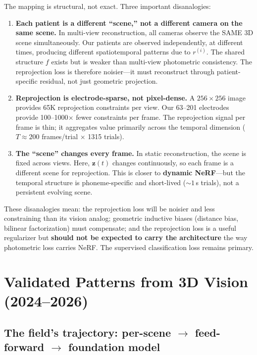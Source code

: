 \documentclass[11pt,letterpaper]{article}
\newcommand{\bfz}{\mathbf{z}}
\begin{document}
The mapping is structural, not exact. Three important disanalogies:

\begin{enumerate}[leftmargin=2em]
\item \textbf{Each patient is a different ``scene,'' not a different camera on the same scene.} In multi-view reconstruction, all cameras observe the SAME 3D scene simultaneously. Our patients are observed independently, at different times, producing different spatiotemporal patterns due to $r^{(i)}$. The shared structure $f$ exists but is weaker than multi-view photometric consistency. The reprojection loss is therefore noisier---it must reconstruct through patient-specific residual, not just geometric projection.

\item \textbf{Reprojection is electrode-sparse, not pixel-dense.} A $256{\times}256$ image provides 65K reprojection constraints per view. Our 63--201 electrodes provide 100--1000$\times$ fewer constraints per frame. The reprojection signal per frame is thin; it aggregates value primarily across the temporal dimension ($T {\approx} 200$ frames/trial $\times$ 1315 trials).

\item \textbf{The ``scene'' changes every frame.} In static reconstruction, the scene is fixed across views. Here, $\bfz(t)$ changes continuously, so each frame is a different scene for reprojection. This is closer to \textbf{dynamic NeRF}---but the temporal structure is phoneme-specific and short-lived (${\sim}1$\,s trials), not a persistent evolving scene.
\end{enumerate}

\noindent These disanalogies mean: the reprojection loss will be noisier and less constraining than its vision analog; geometric inductive biases (distance bias, bilinear factorization) must compensate; and the reprojection loss is a useful regularizer but \textbf{should not be expected to carry the architecture} the way photometric loss carries NeRF. The supervised classification loss remains primary.


\section{Validated Patterns from 3D Vision (2024--2026)}

\subsection{The field's trajectory: per-scene $\to$ feed-forward $\to$ foundation model}
\end{document}
